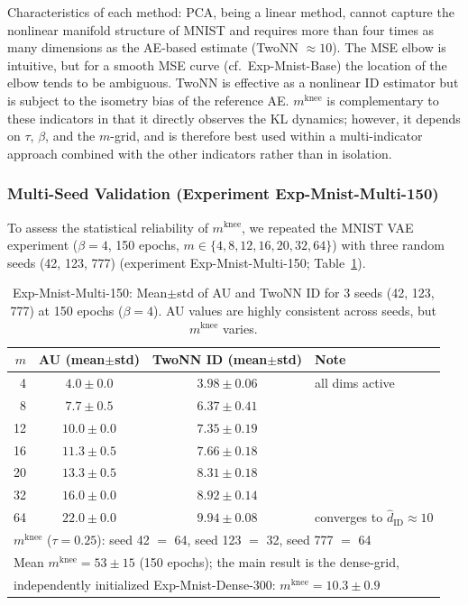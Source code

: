 \documentclass[make,article,submit,pdftex,moreauthors]{Definitions/mdpi}
\newcommand{\mknee}{m^{\mathrm{knee}}}
\begin{document}
Characteristics of each method:
PCA, being a linear method, cannot capture the nonlinear manifold structure of MNIST and
requires more than four times as many dimensions as the AE-based estimate (TwoNN $\approx 10$).
The MSE elbow is intuitive, but for a smooth MSE curve (cf.\ Exp-Mnist-Base) the location of
the elbow tends to be ambiguous.
TwoNN is effective as a nonlinear ID estimator but is subject to the isometry bias of the
reference AE.
$\mknee$ is complementary to these indicators in that it directly observes the KL dynamics;
however, it depends on $\tau$, $\beta$, and the $m$-grid, and is therefore best used within a
multi-indicator approach combined with the other indicators rather than in isolation.

\subsubsection{Multi-Seed Validation (Experiment Exp-Mnist-Multi-150)}\label{sec:exp_multiseed}

To assess the statistical reliability of $\mknee$, we repeated the MNIST VAE experiment
($\beta = 4$, 150 epochs, $m \in \{4,8,12,16,20,32,64\}$)
with three random seeds (42, 123, 777)
(experiment Exp-Mnist-Multi-150; Table~\ref{tab:e4_multiseed}).

\begin{table}[H]
\centering
\caption{Exp-Mnist-Multi-150: Mean$\pm$std of AU and TwoNN ID for 3 seeds (42, 123, 777) at 150 epochs ($\beta=4$). AU values are highly consistent across seeds, but $\mknee$ varies.}
\label{tab:e4_multiseed}
\small
\begin{tabular}{rccl}
\toprule
$m$ & AU (mean$\pm$std) & TwoNN ID (mean$\pm$std) & Note \\
\midrule
 4 & $4.0 \pm 0.0$ & $3.98 \pm 0.06$ & all dims active \\
 8 & $7.7 \pm 0.5$ & $6.37 \pm 0.41$ & \\
12 & $10.0 \pm 0.0$ & $7.35 \pm 0.19$ & \\
16 & $11.3 \pm 0.5$ & $7.66 \pm 0.18$ & \\
20 & $13.3 \pm 0.5$ & $8.31 \pm 0.18$ & \\
32 & $16.0 \pm 0.0$ & $8.92 \pm 0.14$ & \\
64 & $22.0 \pm 0.0$ & $9.94 \pm 0.08$ & converges to $\hat{d}_\mathrm{ID} \approx 10$ \\
\midrule
\multicolumn{4}{l}{$\mknee$ ($\tau=0.25$): seed 42 $=$ 64, seed 123 $=$ 32, seed 777 $=$ 64} \\
\multicolumn{4}{l}{Mean $\mknee = 53 \pm 15$ (150 epochs); the main result is the dense-grid,} \\
\multicolumn{4}{l}{independently initialized Exp-Mnist-Dense-300: $\mknee = 10.3 \pm 0.9$} \\
\bottomrule
\end{tabular}
\end{table}
\end{document}

